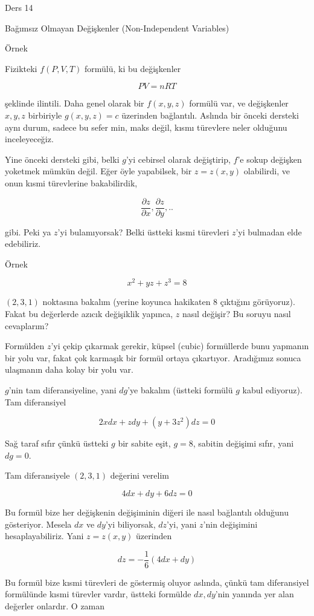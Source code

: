 \documentclass[12pt,fleqn]{article}\usepackage{../../common}
\begin{document}
Ders 14

Bağımsız Olmayan Değişkenler (Non-Independent Variables)

Örnek

Fizikteki $f(P,V,T)$ formülü, ki bu değişkenler 

$$ PV = nRT $$

şeklinde ilintili. Daha genel olarak bir $f(x,y,z)$ formülü var, ve
değişkenler $x,y,z$ birbiriyle $g(x,y,z) = c$ üzerinden bağlantılı. Aslında
bir önceki dersteki aynı durum, sadece bu sefer min, maks değil, kısmı
türevlere neler olduğunu inceleyeceğiz. 

Yine önceki dersteki gibi, belki $g$'yi cebirsel olarak değiştirip, $f$'e sokup
değişken yoketmek mümkün değil. Eğer öyle yapabilsek, bir $z = z(x,y)$
olabilirdi, ve onun kısmi türevlerine bakabilirdik,

$$ \frac{\partial z}{\partial x}, \frac{\partial z}{\partial y}, .. $$

gibi. Peki ya $z$'yi bulamıyorsak? Belki üstteki kısmi türevleri $z$'yi
bulmadan elde edebiliriz. 

Örnek

$$ x^2 + yz + z^3 = 8 $$

$(2,3,1)$ noktasına bakalım (yerine koyunca hakikaten 8 çıktığını
görüyoruz). Fakat bu değerlerde azıcık değişiklik yapınca, $z$ nasıl
değişir? Bu soruyu nasıl cevaplarım? 

Formülden $z$'yi çekip çıkarmak gerekir, küpsel (cubic) formüllerde bunu
yapmanın bir yolu var, fakat çok karmaşık bir formül ortaya
çıkartıyor. Aradığımız sonuca ulaşmanın daha kolay bir yolu var. 

$g$'nin tam diferansiyeline, yani $dg$'ye bakalım (üstteki formülü $g$
kabul ediyoruz). Tam diferansiyel

$$ 2x dx + z dy + (y+3z^2) dz = 0$$

Sağ taraf sıfır çünkü üstteki $g$ bir sabite eşit, $g=8$, sabitin değişimi
sıfır, yani $dg=0$. 

Tam diferansiyele $(2,3,1)$ değerini verelim

$$ 4dx + dy + 6dz = 0 $$

Bu formül bize her değişkenin değişiminin diğeri ile nasıl bağlantılı
olduğunu gösteriyor. Mesela $dx$ ve $dy$'yi biliyorsak, $dz$'yi, yani
$z$'nin değişimini hesaplayabiliriz. Yani $z=z(x,y)$ üzerinden 

$$ dz = -\frac{1}{6}(4dx + dy) $$

Bu formül bize kısmi türevleri de göstermiş oluyor aslında, çünkü tam
diferansiyel formülünde kısmi türevler vardır, üstteki formülde $dx,dy$'nin
yanında yer alan değerler onlardır. O zaman
\end{document}
